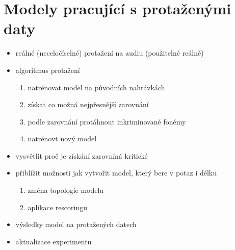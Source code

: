 \section{Modely pracující s protaženými daty}
\label{chap:experiments:durationmodels}

\begin{itemize}
  \item reálné (neceločíselné) protažení na audiu (použitelné reálně)
  \item algoritmus protažení
  \begin{enumerate}
    \item natrénovat model na původních nahrávkách
    \item získat co možná nejpřesnější zarovnání
    \item podle zarovnání protáhnout inkriminované fonémy
    \item natrénovt nový model
  \end{enumerate}
  \item vysvětlit proč je získání zarovníná kritické
  \item přiblížit možnosti jak vytvořit model, který bere v potaz i délku
  \begin{enumerate}
    \item změna topologie modelu
    \item aplikace rescoringu
  \end{enumerate}
  \item výsledky model na  protažených datech
  \item aktualizace experimentu 
\end{itemize}

